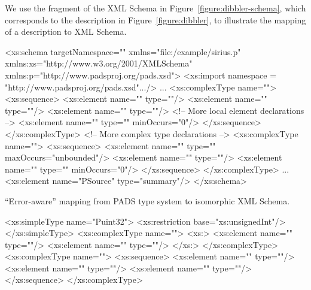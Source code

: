 We use the fragment of the XML Schema in
Figure~\ref{figure:dibbler-schema}, which corresponds to the
description in Figure~\ref{figure:dibbler}, to illustrate the mapping
of a \pads{} description to XML Schema.
\begin{figure*}
\begin{small}
\begin{code}
<xs:schema targetNamespace=""
           xmlns="file:/example/sirius.p"
           xmlns:xs="http://www.w3.org/2001/XMLSchema"
           xmlns:p="http://www.padsproj.org/pads.xsd">
<xs:import namespace = "http://www.padsproj.org/pads.xsd".../>
...
<xs:complexType name="">
 <xs:sequence>
  <xs:element name=""     type=""/>
  <xs:element name="" type=""/>
  <xs:element name=""   type=""/>
  <!-- More local element declarations -->
  <xs:element name=""            type="" minOccurs="0"/>
 </xs:sequence>
</xs:complexType>
<!-- More complex type declarations -->
<xs:complexType name="">
 <xs:sequence>
  <xs:element name=""    type="" maxOccurs="unbounded"/>
  <xs:element name="" type=""/>
  <xs:element name=""     type="" minOccurs="0"/>
 </xs:sequence>
</xs:complexType>
...
<xs:element name="PSource" type="summary"/>
</xs:schema>
\end{code}
\end{small}
\caption{Fragment of XML Schema for \dibbler{} \pads{} description.}
\label{figure:dibbler-schema}
\end{figure*}

``Error-aware'' mapping from PADS type system to isomorphic XML
Schema. 
\begin{small}
\begin{code}
<xs:simpleType name="Puint32">
  <xs:restriction base="xs:unsignedInt"/>
</xs:simpleType>
<xs:complexType name="">
  <xs:>
   <xs:element name="" type=""/>
   <xs:element name=""  type=""/>
  </xs:>
</xs:complexType>
<xs:complexType name="">
 <xs:sequence>
   <xs:element name=""  type=""/>
   <xs:element name="" type=""/>
   <xs:element name=""     type=""/>
 </xs:sequence>
</xs:complexType>
\end{code}
\end{small}

